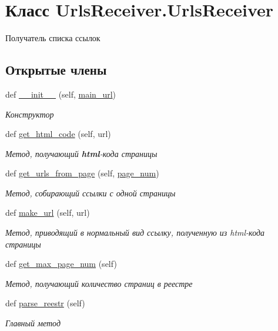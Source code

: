 \hypertarget{classUrlsReceiver_1_1UrlsReceiver}{}\section{Класс Urls\+Receiver.\+Urls\+Receiver}
\label{classUrlsReceiver_1_1UrlsReceiver}


Получатель списка ссылок  


\subsection*{Открытые члены}
\begin{DoxyCompactItemize}
\item 
def \hyperlink{classUrlsReceiver_1_1UrlsReceiver_ae4ba1b935dce3bd30912583beca32aff}{\+\_\+\+\_\+init\+\_\+\+\_\+} (self, \hyperlink{classUrlsReceiver_1_1UrlsReceiver_a26ea003c345156c0e7cdeb49750b15f2}{main\+\_\+url})
\begin{DoxyCompactList}\small\item\em Конструктор \end{DoxyCompactList}\item 
def \hyperlink{classUrlsReceiver_1_1UrlsReceiver_a448316919bfe59e35942edc34f2b674b}{get\+\_\+html\+\_\+code} (self, url)
\begin{DoxyCompactList}\small\item\em Метод, получающий {\itshape {\bfseries html}}-\/кода страницы \end{DoxyCompactList}\item 
def \hyperlink{classUrlsReceiver_1_1UrlsReceiver_ace2cdcb9a1bb117d80ec0efad2b2374b}{get\+\_\+urls\+\_\+from\+\_\+page} (self, \hyperlink{classUrlsReceiver_1_1UrlsReceiver_af9f409bb62f37a08c7fc7eb37e07dd2a}{page\+\_\+num})
\begin{DoxyCompactList}\small\item\em Метод, собирающий ссылки с одной страницы \end{DoxyCompactList}\item 
def \hyperlink{classUrlsReceiver_1_1UrlsReceiver_a1dfd347420ffce5e3c510feb8a436d30}{make\+\_\+url} (self, url)
\begin{DoxyCompactList}\small\item\em Метод, приводящий в нормальный вид ссылку, полученную из html-\/кода страницы \end{DoxyCompactList}\item 
def \hyperlink{classUrlsReceiver_1_1UrlsReceiver_a871a6b2bc7d65cd8ea6184061f994592}{get\+\_\+max\+\_\+page\+\_\+num} (self)
\begin{DoxyCompactList}\small\item\em Метод, получающий количество страниц в реестре \end{DoxyCompactList}\item 
def \hyperlink{classUrlsReceiver_1_1UrlsReceiver_abf0eed73148dbb302da0b4a09efb4940}{parse\+\_\+reestr} (self)
\begin{DoxyCompactList}\small\item\em Главный метод \end{DoxyCompactList}\end{DoxyCompactItemize}
